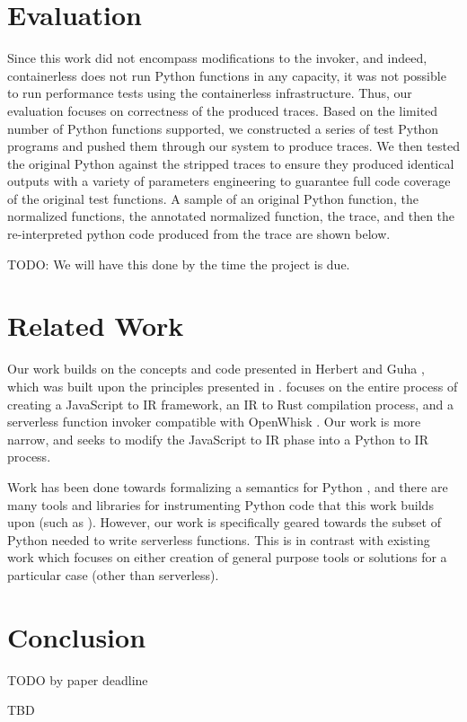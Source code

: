 \documentclass[acmsmall,review,authorversion]{acmart}
\begin{document}
\section{Evaluation}
\label{section:evaluation}

Since this work did not encompass modifications to the invoker, and indeed, containerless does not run Python functions in any capacity, it was not possible to run performance tests using the containerless infrastructure. Thus, our evaluation focuses on correctness of the produced traces. Based on the limited number of Python functions supported, we constructed a series of test Python programs and pushed them through our system to produce traces. We then tested the original Python against the stripped traces to ensure they produced identical outputs with a variety of parameters engineering to guarantee full code coverage of the original test functions. A sample of an original Python function, the normalized functions, the annotated normalized function, the trace, and then the re-interpreted python code produced from the trace are shown below.

TODO: We will have this done by the time the project is due.

\section{Related Work}
\label{section:relwork}

Our work builds on the concepts and code presented in Herbert and Guha \cite{ServerlessAccel}, which was built upon the principles presented in \cite{FormalFoundations}. \cite{ServerlessAccel} focuses on the entire process of creating a JavaScript to IR framework, an IR to Rust compilation process, and a serverless function invoker compatible with OpenWhisk \cite{OpenWhisk}. Our work is more narrow, and seeks to modify the JavaScript to IR phase into a Python to IR process.


Work has been done towards formalizing a semantics for Python \cite{pyOpSem}, and there are many tools and libraries for instrumenting Python code that this work builds upon (such as \cite{rpython}). However, our work is specifically geared towards the subset of Python needed to write serverless functions. This is in contrast with existing work which focuses on either creation of general purpose tools or solutions for a particular case (other than serverless).

\section{Conclusion}

TODO by paper deadline

\begin{acks}
TBD
\end{acks}



\end{document}
